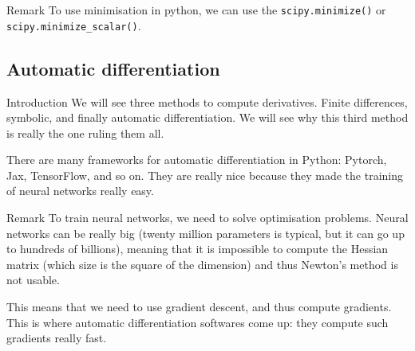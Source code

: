 \documentclass[a4paper]{article}
\begin{document}
\begin{parag}{Remark}
    To use minimisation in python, we can use the \texttt{scipy.minimize()} or \texttt{scipy.minimize\_scalar()}.
\end{parag}


\subsection{Automatic differentiation}
\begin{parag}{Introduction}
    We will see three methods to compute derivatives. Finite differences, symbolic, and finally automatic differentiation. We will see why this third method is really the one ruling them all.

    There are many frameworks for automatic differentiation in Python: Pytorch, Jax, TensorFlow, and so on. They are really nice because they made the training of neural networks really easy.

    \begin{subparag}{Remark}
        To train neural networks, we need to solve optimisation problems. Neural networks can be really big (twenty million parameters is typical, but it can go up to hundreds of billions), meaning that it is impossible to compute the Hessian matrix (which size is the square of the dimension) and thus Newton's method is not usable.

        This means that we need to use gradient descent, and thus compute gradients. This is where automatic differentiation softwares come up: they compute such gradients really fast.
    \end{subparag}
\end{parag}
\end{document}
